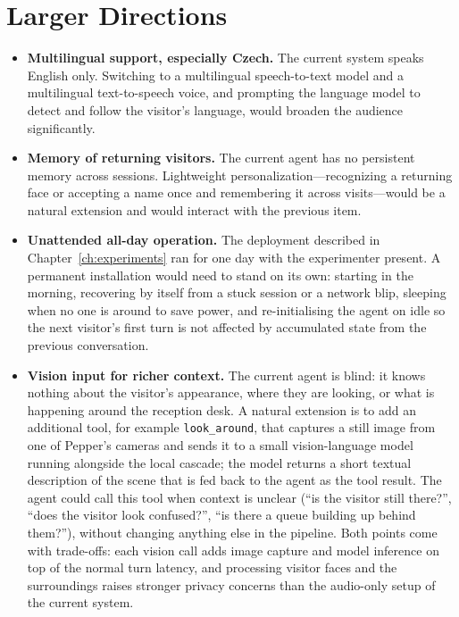 \section{Larger Directions}
\label{sec:fw_larger}

\begin{itemize}
    \item \textbf{Multilingual support, especially Czech.}
    The current system speaks English only.
    Switching to a multilingual speech-to-text model and a multilingual text-to-speech voice, and prompting the language model to detect and follow the visitor's language, would broaden the audience significantly.

    \item \textbf{Memory of returning visitors.}
    The current agent has no persistent memory across sessions.
    Lightweight personalization---recognizing a returning face or accepting a name once and remembering it across visits---would be a natural extension and would interact with the previous item.

    \item \textbf{Unattended all-day operation.}
    The deployment described in Chapter~\ref{ch:experiments} ran for one day with the experimenter present.
    A permanent installation would need to stand on its own: starting in the morning, recovering by itself from a stuck session or a network blip, sleeping when no one is around to save power, and re-initialising the agent on idle so the next visitor's first turn is not affected by accumulated state from the previous conversation.

    \item \textbf{Vision input for richer context.}
    The current agent is blind: it knows nothing about the visitor's appearance, where they are looking, or what is happening around the reception desk.
    A natural extension is to add an additional tool, for example \texttt{look\_around}, that captures a still image from one of Pepper's cameras and sends it to a small vision-language model running alongside the local cascade; the model returns a short textual description of the scene that is fed back to the agent as the tool result.
    The agent could call this tool when context is unclear (``is the visitor still there?'', ``does the visitor look confused?'', ``is there a queue building up behind them?''), without changing anything else in the pipeline.
    Both points come with trade-offs: each vision call adds image capture and model inference on top of the normal turn latency, and processing visitor faces and the surroundings raises stronger privacy concerns than the audio-only setup of the current system.

\end{itemize}
